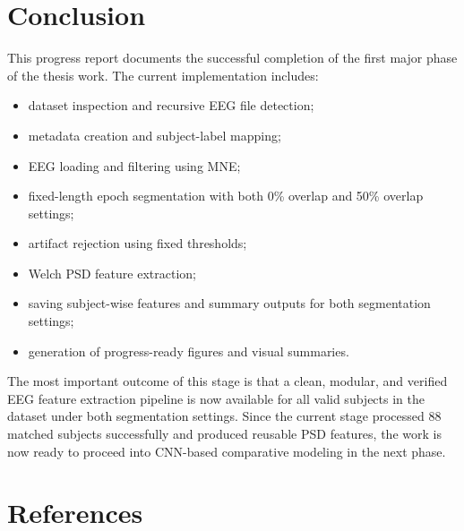 \documentclass[12pt,a4paper]{article}
\begin{document}
\section{Conclusion}

This progress report documents the successful completion of the first major phase of the thesis work. The current implementation includes:
\begin{itemize}
    \item dataset inspection and recursive EEG file detection;
    \item metadata creation and subject-label mapping;
    \item EEG loading and filtering using MNE;
    \item fixed-length epoch segmentation with both 0\% overlap and 50\% overlap settings;
    \item artifact rejection using fixed thresholds;
    \item Welch PSD feature extraction;
    \item saving subject-wise features and summary outputs for both segmentation settings;
    \item generation of progress-ready figures and visual summaries.
\end{itemize}

The most important outcome of this stage is that a clean, modular, and verified EEG feature extraction pipeline is now available for all valid subjects in the dataset under both segmentation settings. Since the current stage processed 88 matched subjects successfully and produced reusable PSD features, the work is now ready to proceed into CNN-based comparative modeling in the next phase.

\newpage

\section{References}
\end{document}
